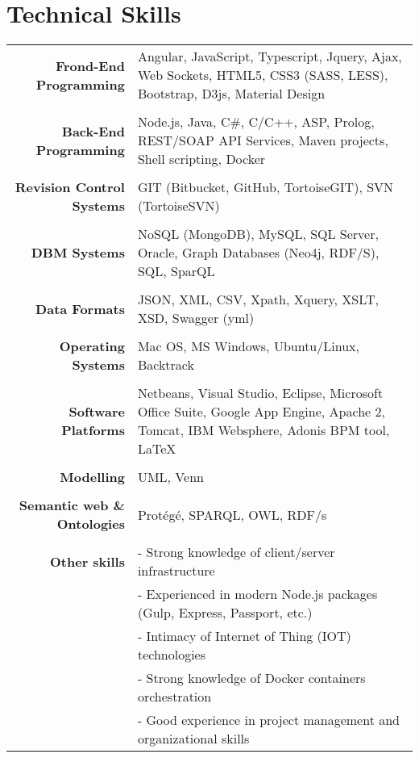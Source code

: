 \documentclass[11pt]{article}
\begin{document}
\section{Technical Skills}
\begin{longtable}{rp{12cm}}
\textbf{Frond-End Programming} & Angular, JavaScript, Typescript, Jquery, Ajax, Web Sockets, HTML5, CSS3 (SASS, LESS), Bootstrap, D3js, Material Design\\

\\\textbf{Back-End Programming} & Node.js, Java, C\#, C/C++, ASP, Prolog, REST/SOAP API Services, Maven projects, Shell scripting, Docker  \\

\\\textbf{Revision Control Systems} & GIT (Bitbucket, GitHub, TortoiseGIT), SVN (TortoiseSVN) \\

\\\textbf{DBM Systems} & NoSQL (MongoDB), MySQL, SQL Server, Oracle, Graph Databases (Neo4j, RDF/S), SQL, SparQL  \\

\\\textbf{Data Formats} & JSON, XML, CSV, Xpath, Xquery, XSLT, XSD, Swagger (yml)\\

\\\textbf{Operating Systems} & Mac OS, MS Windows, Ubuntu/Linux, Backtrack\\

\\\textbf{Software Platforms} & Netbeans, Visual Studio, Eclipse, Microsoft Office Suite, Google App Engine, Apache 2, Tomcat, IBM Websphere, Adonis BPM tool, \LaTeX \\

\\\textbf{Modelling} & UML, Venn\\

\\\textbf{Semantic web \& Ontologies} & Protégé, SPARQL, OWL, RDF/s\\

\\\textbf{Other skills} & - Strong knowledge of client/server infrastructure \\
& - Experienced in modern Node.js packages (Gulp, Express, Passport, etc.) \\
& - Intimacy of Internet of Thing (IOT) technologies \\
& - Strong knowledge of Docker containers orchestration \\
& - Good experience in project management and organizational skills \\

\end{longtable}
\end{document}
